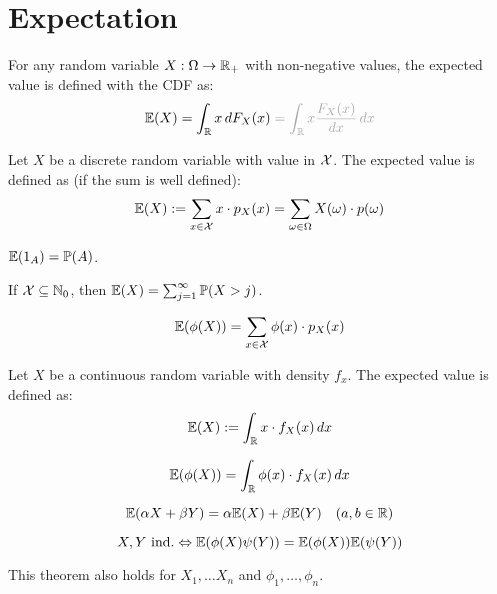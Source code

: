 \section{Expectation}

For any random variable \(X: \Omega \to \mathbb{R}_+\) with non-negative values, the expected value is defined with the CDF as:
\[\E(X) = \int_\R x \,dF_X(x) \color{gray!70} = \int_\R x \frac{F_X(x)}{dx} \, dx\]

\begin{ddefinition*}
  Let \(X\) be a discrete random variable with value in \(\operatorname{\mathcal{X}}\). The expected value is defined as (if the sum is well defined):
  \[\mathbb{E}(X) := \sum_{x \in \operatorname{\mathcal{X}}}x \cdot p_X(x) = \sum_{\omega \in \Omega} X(\omega) \cdot p(\omega)\]
\end{ddefinition*}

\begin{proposition}
  {\small \(\mathbb{E}(1_A) = \mathbb{P}(A)\)}.
\end{proposition}

\begin{proposition}
  If \(\operatorname{\mathcal{X}} \subseteq \mathbb{N}_0\), then \(\mathbb{E}(X) = \sum_{j=1}^\infty \mathbb{P}(X > j)\).
\end{proposition}

\begin{dtheorem*} \vspace{-5pt}
  \[\mathbb{E}(\phi(X)) = \sum_{x \in \operatorname{\mathcal{X}}}\phi(x) \cdot p_X(x)\]
\end{dtheorem*}

\begin{cdefinition*}
  Let \(X\) be a continuous random variable with density \(f_x\). The expected value is defined as:
  \[\mathbb{E}(X) := \int_{\mathbb{R}} x \cdot f_X(x) \,dx\]
\end{cdefinition*}

\begin{ctheorem*} \vspace{-5pt}
  \[\mathbb{E}(\phi(X)) = \int_{\mathbb{R}} \phi(x) \cdot f_X(x) \, dx\]
\end{ctheorem*}

\begin{theorem*} \vspace{-5pt}
  \[\mathbb{E}(\alpha X + \beta Y) = \alpha \mathbb{E}(X) + \beta \mathbb{E}(Y) \quad (a, b \in \mathbb{R})\]
\end{theorem*}

\begin{theorem*} \vspace{-5pt}
  \[X, Y \ \text{ind.} \Leftrightarrow \mathbb{E}(\phi(X) \psi(Y)) = \mathbb{E}(\phi(X)) \mathbb{E}(\psi(Y))\]
\end{theorem*}
This theorem also holds for \(X_1, \ldots X_n\) and \(\phi_1, \ldots, \phi_n\).

